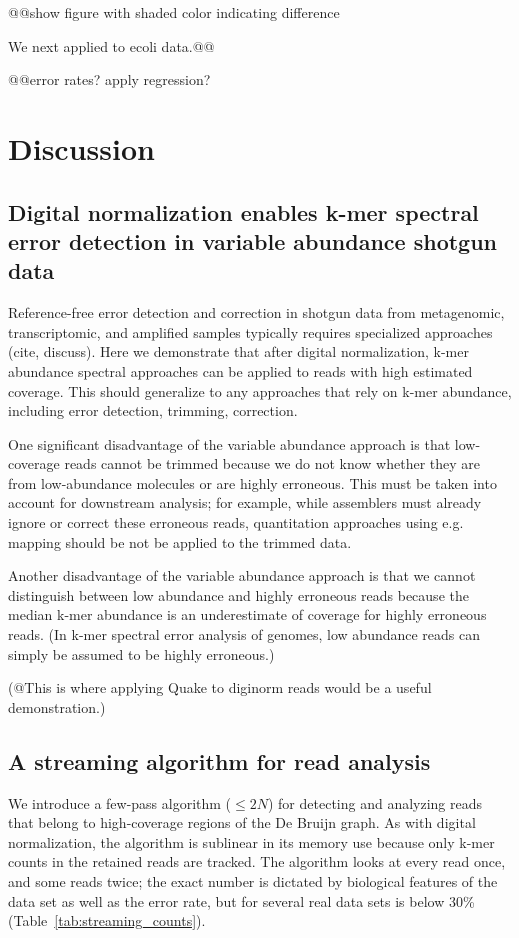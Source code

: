 \documentclass{article}
\begin{document}
@@show figure with shaded color indicating difference

We next applied to ecoli data.@@

@@error rates? apply regression?

\section{Discussion}

\subsection{Digital normalization enables k-mer spectral error detection in variable abundance shotgun data}

Reference-free error detection and correction in shotgun data from
metagenomic, transcriptomic, and amplified samples typically requires
specialized approaches (cite, discuss).  Here we demonstrate that
after digital normalization, k-mer abundance spectral approaches can
be applied to reads with high estimated coverage.  This should
generalize to any approaches that rely on k-mer abundance, including
error detection, trimming, correction.

One significant disadvantage of the variable abundance approach is
that low-coverage reads cannot be trimmed because we do not know
whether they are from low-abundance molecules or are highly erroneous.
This must be taken into account for downstream analysis; for example,
while assemblers must already ignore or correct these erroneous reads,
quantitation approaches using e.g. mapping should be not be applied
to the trimmed data.

Another disadvantage of the variable abundance approach is that we cannot
distinguish between low abundance and highly erroneous reads because the
median k-mer abundance is an underestimate of coverage for highly erroneous
reads.  (In k-mer spectral error analysis of genomes, low abundance reads
can simply be assumed to be highly erroneous.)

(@This is where applying Quake to diginorm reads would be a useful demonstration.)

\subsection{A streaming algorithm for read analysis}

We introduce a few-pass algorithm ($\leq 2N$) for detecting and
analyzing reads that belong to high-coverage regions of the De Bruijn
graph.  As with digital normalization, the algorithm is sublinear in
its memory use because only k-mer counts in the retained reads are
tracked.  The algorithm looks at every read once, and some reads
twice; the exact number is dictated by biological features of the
data set as well as the error rate, but for several real data sets is below
30\% (Table~\ref{tab:streaming_counts}).
\end{document}
